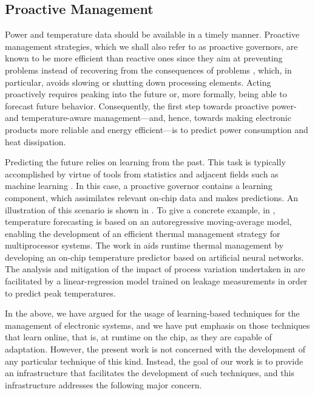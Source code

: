 \subsection{Proactive Management}

Power and temperature data should be available in a timely manner. Proactive
management strategies, which we shall also refer to as proactive governors, are
known to be more efficient than reactive ones since they aim at preventing
problems instead of recovering from the consequences of problems
\cite{coskun2008, chaudhry2015}, which, in particular, avoids slowing or
shutting down processing elements. Acting proactively requires peaking into the
future or, more formally, being able to forecast future behavior. Consequently,
the first step towards proactive power- and temperature-aware management---and,
hence, towards making electronic products more reliable and energy
efficient---is to predict power consumption and heat dissipation.

Predicting the future relies on learning from the past. This task is typically
accomplished by virtue of tools from statistics and adjacent fields such as
machine learning \cite{bishop2006}. In this case, a proactive governor contains
a learning component, which assimilates relevant on-chip data and makes
predictions. An illustration of this scenario is shown in . To
give a concrete example, in \cite{coskun2008}, temperature forecasting is based
on an autoregressive moving-average model, enabling the development of an
efficient thermal management strategy for multiprocessor systems. The work in
\cite{kumar2010} aids runtime thermal management by developing an on-chip
temperature predictor based on artificial neural networks. The analysis and
mitigation of the impact of process variation undertaken in \cite{juan2014} are
facilitated by a linear-regression model trained on leakage measurements in
order to predict peak temperatures.

In the above, we have argued for the usage of learning-based techniques for the
management of electronic systems, and we have put emphasis on those techniques
that learn online, that is, at runtime on the chip, as they are capable of
adaptation. However, the present work is not concerned with the development of
any particular technique of this kind. Instead, the goal of our work is to
provide an infrastructure that facilitates the development of such techniques,
and this infrastructure addresses the following major concern.

